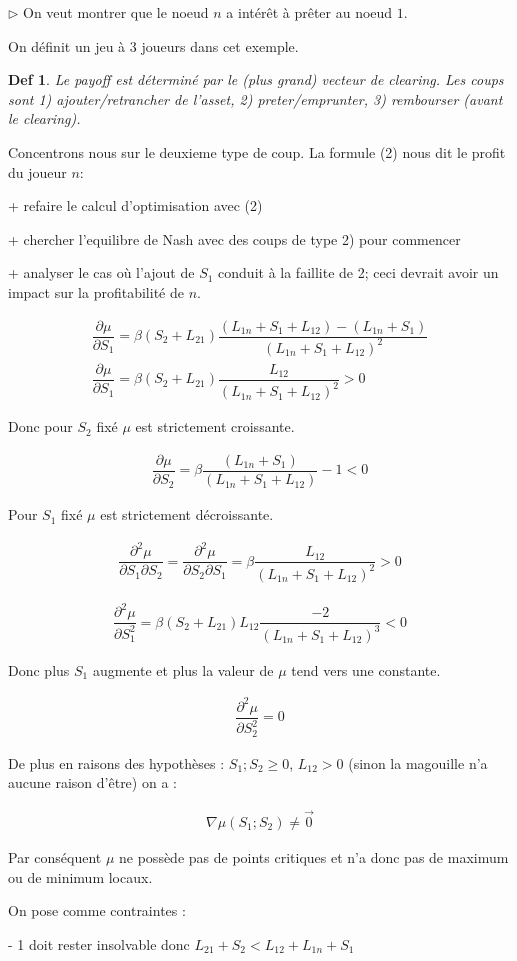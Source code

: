 \documentclass{article}
\newtheorem{definition}{Def}
\def\AR#1{
\[
\begin{array}{llllllll}
#1
\end{array}
\]
}
\begin{document}
$\triangleright$ 
On veut montrer que le noeud $n$ a intérêt à prêter au noeud $1$.

On définit un jeu à 3 joueurs dans cet exemple.
\begin{definition}\label{jeu3}
Le payoff est déterminé par le (plus grand) vecteur de clearing.
Les coups sont 1) ajouter/retrancher de l'asset,
2) preter/emprunter,
3) rembourser (avant le clearing).
\end{definition}

Concentrons nous sur le deuxieme type de coup.
La formule (2) nous dit le profit du joueur $n$:

+ refaire le calcul d'optimisation avec (2)

+ chercher l'equilibre de Nash avec des coups de type 2) pour commencer

+ analyser le cas où l'ajout de $S_1$ conduit à la faillite de 2; ceci devrait avoir un impact sur la profitabilité de $n$.

\AR{
\dfrac
{\partial \mu}
{\partial S_{1}} =
\beta
(S_{2} + L_{21}) 
\dfrac
{(L_{1n}+S_{1}+L_{12}) - (L_{1n}+S_{1})}
{(L_{1n}+S_{1}+L_{12})^{2}}
\\
\dfrac
{\partial \mu}
{\partial S_{1}} =
\beta
(S_{2} + L_{21}) 
\dfrac
{L_{12}}
{(L_{1n}+S_{1}+L_{12})^{2}}
>
0
}
Donc pour $S_{2}$ fixé $\mu$ est strictement croissante.


\AR{
\dfrac
{\partial \mu}
{\partial S_{2}} =
\beta
\dfrac
{(L_{1n}+S_{1})}
{(L_{1n}+S_{1}+L_{12})}
- 1
< 
0
}
Pour $S_{1}$ fixé $\mu$ est strictement décroissante.

\AR{
\dfrac
{\partial^{2} \mu}
{\partial S_{1} \partial S_{2}} =
\dfrac
{\partial^{2} \mu}
{\partial S_{2} \partial S_{1}} =
\beta
\dfrac
{L_{12}}
{(L_{1n}+S_{1}+L_{12})^{2}}
>
0
}

\AR{
\dfrac
{\partial^{2} \mu}
{\partial S_{1}^{2}} =
\beta
(S_{2} + L_{21})L_{12}
\dfrac
{-2}
{(L_{1n}+S_{1}+L_{12})^{3}}
<
0
}
Donc plus $S_{1}$ augmente et plus la valeur de $\mu$ tend vers une constante.

\AR{
\dfrac
{\partial^{2} \mu}
{\partial S_{2}^{2}} =
0
}

De plus en raisons des hypothèses : $S_{1}; S_{2} \geq 0$, $L_{12} > 0$ (sinon la magouille n'a aucune raison d'être) on a :
\AR{
\nabla \mu(S_{1}; S_{2})
\neq
\vec{0}
}
Par conséquent $\mu$ ne possède pas de points critiques et n'a donc pas de maximum ou de minimum locaux. 


On pose comme contraintes :

- 1 doit rester insolvable donc $L_{21} + S_{2} < L_{12} + L_{1n} + S_{1}$
\end{document}
